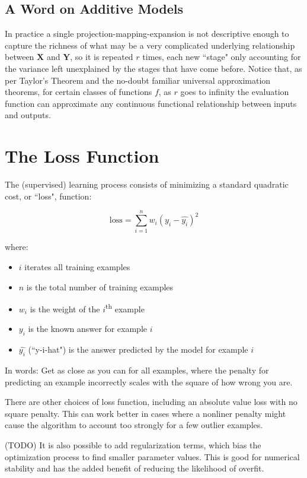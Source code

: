 \documentclass[12pt]{article}
\begin{document}
\subsection{A Word on Additive Models}

In practice a single projection-mapping-expansion is not descriptive enough to capture the richness of what may be a very complicated underlying relationship between $\pmb{X}$ and $\pmb{Y}$, so it is repeated $r$ times, each new ``stage" only accounting for the variance left unexplained by the stages that have come before. Notice that, as per Taylor's Theorem and the no-doubt familiar universal approximation theorems, for certain classes of functions $f$, as $r$ goes to infinity the evaluation function can approximate any continuous functional relationship between inputs and outputs.

\section{The Loss Function}

The (supervised) learning process consists of minimizing a standard quadratic cost, or ``loss", function:

$$\text{loss} = \sum_{i=1}^n w_i (y_i - \hat{y_i})^2$$

where:
\begin{itemize}
	\setlength\itemsep{-2mm}
	\item $i$ iterates all training examples
	\item $n$ is the total number of training examples
	\item $w_i$ is the weight of the $i$\textsuperscript{th} example
	\item $y_i$ is the known answer for example $i$
	\item $\hat{y_i}$ (``y-i-hat") is the answer predicted by the model for example $i$
\end{itemize}

In words: Get as close as you can for all examples, where the penalty for predicting an example incorrectly scales with the square of how wrong you are.

There are other choices of loss function, including an absolute value loss with no square penalty. This can work better in cases where a nonliner penalty might cause the algorithm to account too strongly for a few outlier examples.

(TODO) It is also possible to add regularization terms, which bias the optimization process to find smaller parameter values. This is good for numerical stability and has the added benefit of reducing the likelihood of overfit.
\end{document}
